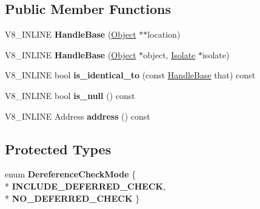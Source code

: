 \subsection*{Public Member Functions}
\begin{DoxyCompactItemize}
\item 
V8\+\_\+\+I\+N\+L\+I\+NE {\bfseries Handle\+Base} (\hyperlink{classv8_1_1internal_1_1_object}{Object} $\ast$$\ast$location)\hypertarget{classv8_1_1internal_1_1_handle_base_aa62b55488a6da424616c060679172576}{}\label{classv8_1_1internal_1_1_handle_base_aa62b55488a6da424616c060679172576}

\item 
V8\+\_\+\+I\+N\+L\+I\+NE {\bfseries Handle\+Base} (\hyperlink{classv8_1_1internal_1_1_object}{Object} $\ast$object, \hyperlink{classv8_1_1internal_1_1_isolate}{Isolate} $\ast$isolate)\hypertarget{classv8_1_1internal_1_1_handle_base_a556ce068aa793e80e8e33e841d251629}{}\label{classv8_1_1internal_1_1_handle_base_a556ce068aa793e80e8e33e841d251629}

\item 
V8\+\_\+\+I\+N\+L\+I\+NE bool {\bfseries is\+\_\+identical\+\_\+to} (const \hyperlink{classv8_1_1internal_1_1_handle_base}{Handle\+Base} that) const \hypertarget{classv8_1_1internal_1_1_handle_base_a7bf8e31d4f3c84b80ad1e0b516dce89d}{}\label{classv8_1_1internal_1_1_handle_base_a7bf8e31d4f3c84b80ad1e0b516dce89d}

\item 
V8\+\_\+\+I\+N\+L\+I\+NE bool {\bfseries is\+\_\+null} () const \hypertarget{classv8_1_1internal_1_1_handle_base_a5069f2f9dcd9745732325c3b02ee612c}{}\label{classv8_1_1internal_1_1_handle_base_a5069f2f9dcd9745732325c3b02ee612c}

\item 
V8\+\_\+\+I\+N\+L\+I\+NE Address {\bfseries address} () const \hypertarget{classv8_1_1internal_1_1_handle_base_a96b96a5c1e89819fddf4e09091760eb8}{}\label{classv8_1_1internal_1_1_handle_base_a96b96a5c1e89819fddf4e09091760eb8}

\end{DoxyCompactItemize}
\subsection*{Protected Types}
\begin{DoxyCompactItemize}
\item 
enum {\bfseries Dereference\+Check\+Mode} \{ \\*
{\bfseries I\+N\+C\+L\+U\+D\+E\+\_\+\+D\+E\+F\+E\+R\+R\+E\+D\+\_\+\+C\+H\+E\+CK}, 
\\*
{\bfseries N\+O\+\_\+\+D\+E\+F\+E\+R\+R\+E\+D\+\_\+\+C\+H\+E\+CK}
 \}\hypertarget{classv8_1_1internal_1_1_handle_base_ab0cd4ff6a70655c61c64853353d14121}{}\label{classv8_1_1internal_1_1_handle_base_ab0cd4ff6a70655c61c64853353d14121}

\end{DoxyCompactItemize}
